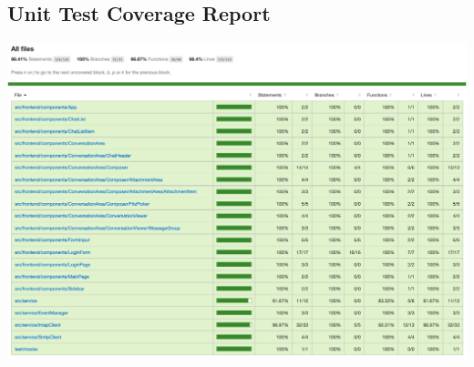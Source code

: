 \begin{appendices}


\chapter{Unit Test Coverage Report}
  \includegraphics[width=\textwidth]{images/coverage-report.png}
  \label{appendix:coverage}

\end{appendices}
